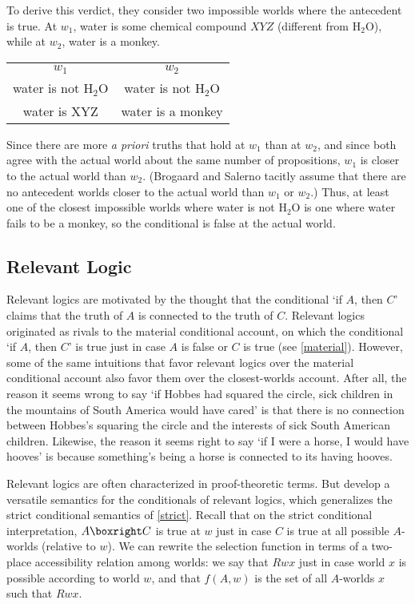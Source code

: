 To derive this verdict, they consider two impossible worlds where the antecedent is true.  At $w_1$, water is some chemical compound $XYZ$ (different from H$_2$O), while at $w_2$, water is a monkey.
\begin{center}
\begin{tabular}{cc}
$w_1$ & $w_2$\\
water is not H$_2$O & water is not H$_2$O\\
water is XYZ & water is a monkey
\end{tabular}
\end{center}
Since there are more \emph{a priori} truths that hold at $w_1$ than at $w_2$, and since both agree with the actual world about the same number of propositions, $w_1$ is closer to the actual world than $w_2$.  (Brogaard and Salerno tacitly assume that there are no antecedent worlds closer to the actual world than $w_1$ or $w_2$.)  Thus, at least one of the closest impossible worlds where water is not H$_2$O is one where water fails to be a monkey, so the conditional is false at the actual world.

\subsection{Relevant Logic}

Relevant logics are motivated by the thought that the conditional `if $A$, then $C$' claims that the truth of $A$ is connected to the truth of $C$.  Relevant logics originated as rivals to the material conditional account, on which the conditional `if $A$, then $C$' is true just in case $A$ is false or $C$ is true (see \autoref{material}).  However, some of the same intuitions that favor relevant logics over the material conditional account also favor them over the closest-worlds account.  After all, the reason it seems wrong to say `if Hobbes had squared the circle, sick children in the mountains of South America would have cared' is that there is no connection between Hobbes's squaring the circle and the interests of sick South American children.  Likewise, the reason it seems right to say `if I were a horse, I would have hooves' is because something's being a horse is connected to its having hooves.

Relevant logics are often characterized in proof-theoretic terms.  But \citet{routley-meyer-1, routley-meyer-2, routley-meyer-3} develop a versatile semantics for the conditionals of relevant logics, which generalizes the strict conditional semantics of \autoref{strict}.  Recall that on the strict conditional interpretation, $A \boxright C$ is true at $w$ just in case $C$ is true at all possible $A$-worlds (relative to $w$).  We can rewrite the selection function in terms of a two-place accessibility relation among worlds: we say that $Rwx$ just in case world $x$ is possible according to world $w$, and that $f(A, w)$ is the set of all $A$-worlds $x$ such that $Rwx$.

